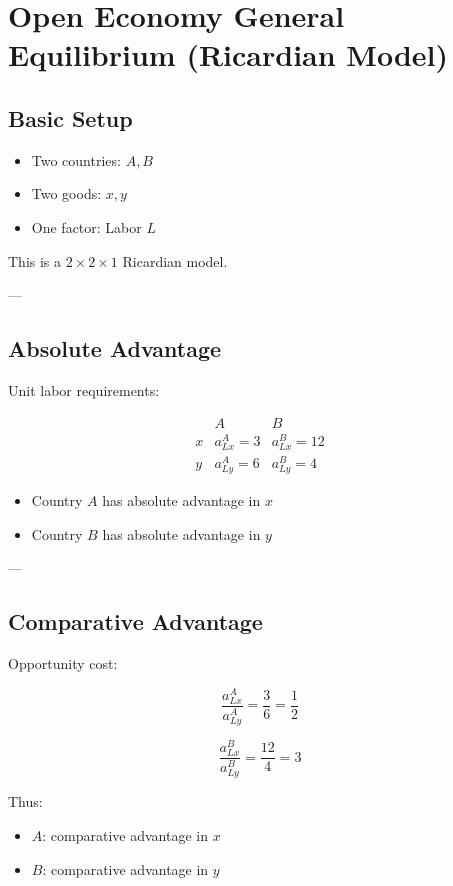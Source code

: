 \chapter{Open Economy General Equilibrium (Ricardian Model)}

\section{Basic Setup}

\begin{itemize}
    \item Two countries: $A, B$
    \item Two goods: $x, y$
    \item One factor: Labor $L$
\end{itemize}

This is a $2 \times 2 \times 1$ Ricardian model.

---

\section{Absolute Advantage}

Unit labor requirements:

\[
\begin{array}{c|cc}
 & A & B \\
\hline
x & a_{Lx}^A = 3 & a_{Lx}^B = 12 \\
y & a_{Ly}^A = 6 & a_{Ly}^B = 4
\end{array}
\]

\begin{itemize}
    \item Country $A$ has absolute advantage in $x$
    \item Country $B$ has absolute advantage in $y$
\end{itemize}

---

\section{Comparative Advantage}

Opportunity cost:

\[
\frac{a_{Lx}^A}{a_{Ly}^A} = \frac{3}{6} = \frac{1}{2}
\]

\[
\frac{a_{Lx}^B}{a_{Ly}^B} = \frac{12}{4} = 3
\]

Thus:
\begin{itemize}
    \item $A$: comparative advantage in $x$
    \item $B$: comparative advantage in $y$
\end{itemize}

